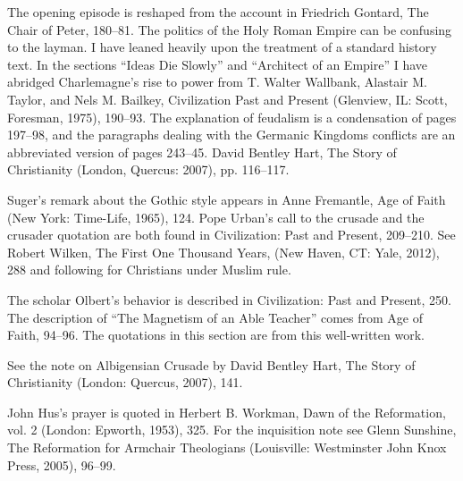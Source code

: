 \begin{notelist}
\entry The opening episode is reshaped from the account in Friedrich Gontard, The Chair of Peter,
  180–81.
\entry The politics of the Holy Roman Empire can be confusing to the layman. I have leaned heavily
  upon the treatment of a standard history text. In the sections “Ideas Die Slowly” and “Architect
  of an Empire” I have abridged Charlemagne’s rise to power from T. Walter Wallbank, Alastair M.
  Taylor, and Nels M. Bailkey, Civilization Past and Present (Glenview, IL: Scott,
\entry Foresman, 1975), 190–93. The explanation of feudalism is a condensation of pages 197–98, and
  the paragraphs dealing with the Germanic Kingdoms conflicts are an abbreviated version of pages
  243–45.
\entry David Bentley Hart, The Story of Christianity (London, Quercus: 2007),
\entry pp. 116–117.
\end{notelist}

\begin{notelist}
\entry Suger’s remark about the Gothic style appears in Anne Fremantle, Age of Faith (New York:
  Time-Life, 1965), 124.
\entry Pope Urban’s call to the crusade and the crusader quotation are both found in Civilization:
  Past and Present, 209–210.
\entry See Robert Wilken, The First One Thousand Years, (New Haven, CT:
\entry Yale, 2012), 288 and following for Christians under Muslim rule.
\end{notelist}

\begin{notelist}
\entry The scholar Olbert’s behavior is described in Civilization: Past and Present, 250.
\entry The description of “The Magnetism of an Able Teacher” comes from Age of Faith, 94–96. The
  quotations in this section are from this well-written work.
\end{notelist}

\begin{notelist}
\entry See the note on Albigensian Crusade by David Bentley Hart, The Story of Christianity (London:
  Quercus, 2007), 141.
\end{notelist}

\begin{notelist}
\entry John Hus’s prayer is quoted in Herbert B. Workman, Dawn of the Reformation, vol. 2 (London:
  Epworth, 1953), 325.
\entry For the inquisition note see Glenn Sunshine, The Reformation for Armchair Theologians
  (Louisville: Westminster John Knox Press, 2005), 96–99.
\end{notelist}

